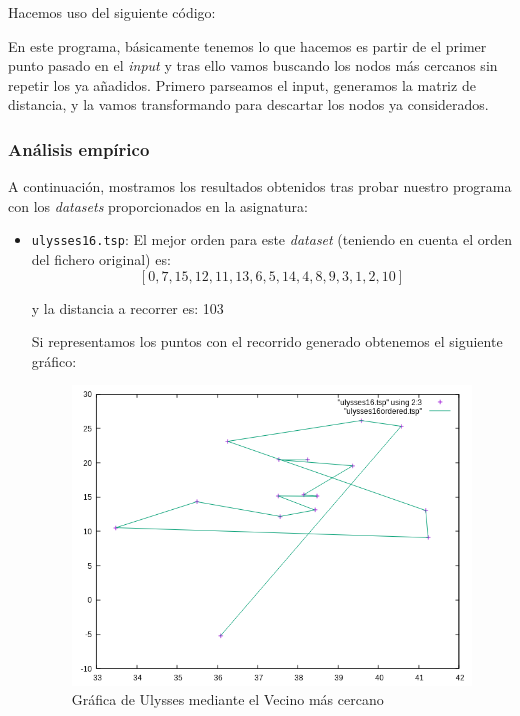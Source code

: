 \documentclass[10pt,a4paper]{article}
\begin{document}
Hacemos uso del siguiente código:


En este programa, básicamente tenemos lo que hacemos es partir de el primer punto pasado en el \textit{input} y tras ello vamos buscando los nodos más cercanos sin repetir los ya añadidos. Primero parseamos el input, generamos la matriz de distancia, y la vamos transformando para descartar los nodos ya considerados. 

\subsubsection*{Análisis empírico}
A continuación, mostramos los resultados obtenidos tras probar nuestro programa con los \textit{datasets} proporcionados en la asignatura:

\begin{itemize}
	\item \texttt{ulysses16.tsp}: El mejor orden para este \textit{dataset} (teniendo en cuenta el orden del fichero original) es:
	\[
		[0,7,15,12,11,13,6,5,14,4,8,9,3,1,2,10]
	\]
	
	y la distancia a recorrer es: 103
	
	Si representamos los puntos con el recorrido generado obtenemos el siguiente gráfico:
	
	\begin{figure}[h!]
	\centering
	\includegraphics[scale=0.5]{./Images/ulysses_cercania.png}
	\caption{Gráfica de Ulysses mediante el Vecino más cercano}
	\end{figure}
	

\end{itemize}
\end{document}
